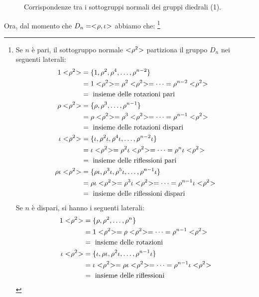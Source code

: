 	\begin{figure}[tp]
		\centering
		$\qquad$
		\caption{Corrispondenze tra i sottogruppi normali dei gruppi diedrali (1).}
		\label{fig:Isometrie_diedrali_normali}
	\end{figure}

	Ora, dal momento che $D_n = < \negmedspace \rho, \iota \negmedspace >$ abbiamo che:
	\footnote{
		Se $n$ è pari, il sottogruppo normale $< \negmedspace \rho^2 \negmedspace >$ partiziona il gruppo $D_n$ nei seguenti laterali:
		\begin{align*}
			1\gen{\rho^2} & = \{1, \rho^2, \rho^4, \dots, \rho^{n-2}\} \\
			& = 1\gen{\rho^2} = \rho^2\gen{\rho^2} = \dots = \rho^{n-2}\gen{\rho^2} \\
			& = \text{ insieme delle rotazioni pari} \\
			\rho\gen{\rho^2} & = \{\rho, \rho^3, \dots, \rho^{n-1}\} \\
			& = \rho\gen{\rho^2} = \rho^3\gen{\rho^2} = \dots = \rho^{n-1}\gen{\rho^2} \\
			& = \text{ insieme delle rotazioni dispari} \\
			\iota\gen{\rho^2} & = \{\iota, \rho^2\iota, \rho^4\iota, \dots, \rho^{n-2}\iota\} \\
			& = \iota\gen{\rho^2} = \rho^2\iota\gen{\rho^2} = \dots = \rho^n\iota\gen{\rho^2} \\
			& = \text{ insieme delle riflessioni pari} \\
			\rho\iota\gen{\rho^2} & = \{\rho\iota, \rho^3\iota, \rho^5\iota, \dots, \rho^{n-1}\iota\} \\
			& = \rho\iota\gen{\rho^2} = \rho^3\iota\gen{\rho^2} = \dots = \rho^{n-1}\iota\gen{\rho^2} \\
			& = \text{ insieme delle riflessioni dispari}
		\end{align*}
		Se $n$ è dispari, si hanno i seguenti laterali:
		\begin{align*}
			1\gen{\rho^2} & = \{\rho, \rho^2, \dots, \rho^n\} \\
			& = 1\gen{\rho^2} = \rho\gen{\rho^2} = \dots = \rho^{n-1}\gen{\rho^2} \\
			& = \text{ insieme delle rotazioni} \\
			\iota\gen{\rho^2} & = \{\iota, \rho\iota, \rho^2\iota, \dots, \rho^{n-1}\iota\} \\
			& = \iota\gen{\rho^2} = \rho\iota\gen{\rho^2} = \dots = \rho^{n-1}\iota\gen{\rho^2} \\
			& = \text{ insieme delle riflessioni} \\
		\end{align*}
	}
	
